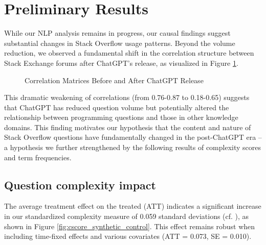 \section{Preliminary Results}
While our NLP analysis remains in progress, our causal findings suggest substantial changes in Stack Overflow usage patterns. Beyond the volume reduction, we observed a fundamental shift in the correlation structure between Stack Exchange forums after ChatGPT's release, as visualized in Figure \ref{fig:correlation_matrix}.

\begin{figure}[htpb!]
    \centering
    
    \caption{Correlation Matrices Before and After ChatGPT Release}
    \label{fig:correlation_matrix}
\end{figure}

This dramatic weakening of correlations (from 0.76-0.87 to 0.18-0.65) suggests that ChatGPT has reduced question volume but potentially altered the relationship between programming questions and those in other knowledge domains. This finding motivates our hypothesis that the content and nature of Stack Overflow questions have fundamentally changed in the post-ChatGPT era -- a hypothesis we further strengthened by the following results of complexity scores and term frequencies.


\subsection{Question complexity impact}

The average treatment effect on the treated (ATT) indicates a significant increase in our standardized complexity measure of 0.059 standard deviations (cf. ), as shown in Figure \ref{fig:cscore_synthetic_control}. This effect remains robust when including time-fixed effects and various covariates (ATT = 0.073, SE = 0.010).  

